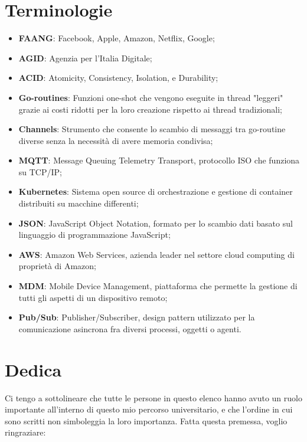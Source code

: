 \documentclass[a4paper, titlepage, 12pt, openright, twoside]{book}
\begin{document}
\chapter{Terminologie}\label{chap:terminologie}

\begin{itemize}
	\item \textbf{FAANG}: Facebook, Apple, Amazon, Netflix, Google;
	\item \textbf{AGID}: Agenzia per l'Italia Digitale;
	\item \textbf{ACID}: Atomicity, Consistency, Isolation, e Durability;
	\item \textbf{Go-routines}: Funzioni one-shot che vengono eseguite in thread "leggeri" grazie ai costi ridotti per la loro creazione rispetto ai thread tradizionali;
	\item \textbf{Channels}: Strumento che consente lo scambio di messaggi tra go-routine diverse senza la necessità di avere memoria condivisa;
	\item \textbf{MQTT}: Message Queuing Telemetry Transport, protocollo ISO che funziona su TCP/IP;
	\item \textbf{Kubernetes}: Sistema open source di orchestrazione e gestione di container distribuiti su macchine differenti;
	\item \textbf{JSON}: JavaScript Object Notation, formato per lo scambio dati basato sul linguaggio di programmazione JavaScript;
	\item \textbf{AWS}: Amazon Web Services, azienda leader nel settore cloud computing di proprietà di Amazon;
	\item \textbf{MDM}: Mobile Device Management, piattaforma che permette la gestione di tutti gli aspetti di un dispositivo remoto;
	\item \textbf{Pub/Sub}: Publisher/Subscriber, design pattern utilizzato per la comunicazione asincrona fra diversi processi, oggetti o agenti.
\end{itemize}

\chapter{Dedica}\label{chap:dedica}

Ci tengo a sottolineare che tutte le persone in questo elenco hanno avuto un ruolo importante all'interno di questo mio percorso universitario, e che l'ordine in cui sono scritti non simboleggia la loro importanza. Fatta questa premessa, voglio ringraziare:
\end{document}
